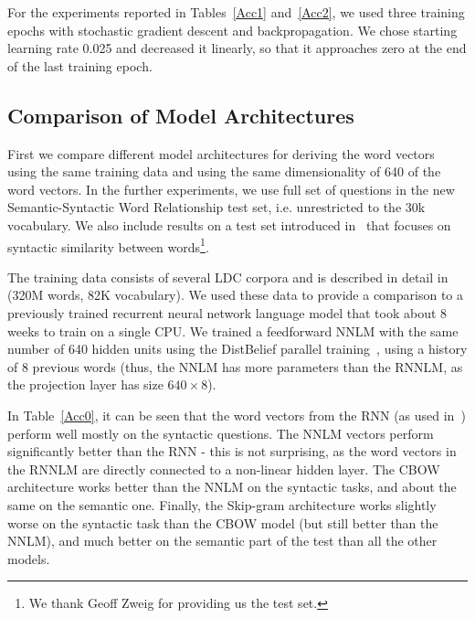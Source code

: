 \documentclass{article} %
\begin{document}
For the experiments reported in Tables~\ref{Acc1} and~\ref{Acc2}, we used three training epochs with stochastic gradient descent and backpropagation. We chose starting learning rate 0.025 and decreased it linearly, so that it approaches zero
at the end of the last training epoch.

\subsection{Comparison of Model Architectures}

First we compare different model architectures for deriving the word vectors using the same training data and using the same dimensionality of 640 of the word vectors.
In the further experiments, we use full set of questions in the new Semantic-Syntactic Word Relationship test set, i.e. unrestricted to the 30k vocabulary.
We also include results on a test set introduced in~\cite{NAACL1} that focuses on syntactic
similarity between words\footnote{We thank Geoff Zweig for providing us the test set.}.

The training data consists of several LDC corpora and is described in detail in~\cite{ASRU} (320M words, 82K vocabulary).
We used these data to provide a comparison to a previously trained recurrent neural network language model
that took about 8 weeks to train on a single CPU. We trained a feedforward NNLM with the same number of 640 hidden units using the DistBelief parallel training~\cite{DistBelief}, using a history of 8 previous words (thus, the NNLM has
more parameters than the RNNLM, as the projection layer has size $640 \times 8$).

In Table~\ref{Acc0}, it can be seen that the word vectors from the RNN (as used in~\cite{NAACL1}) perform well mostly on the syntactic questions. The NNLM vectors perform significantly better than the RNN - this is not surprising, as the
word vectors in the RNNLM are directly connected to a non-linear hidden layer. The CBOW architecture
works better than the NNLM on the syntactic tasks, and about the same on the semantic one. Finally, the Skip-gram architecture works slightly worse on the syntactic task than the CBOW model (but still better than the NNLM), and much better
on the semantic part of the test than all the other models.
\end{document}
